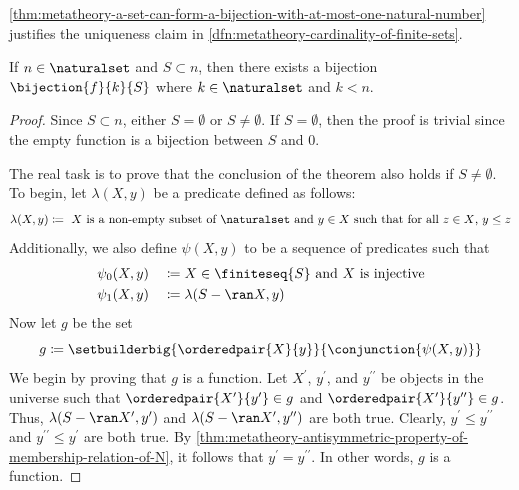 \begin{rem}
    \cref{thm:metatheory-a-set-can-form-a-bijection-with-at-most-one-natural-number} justifies the uniqueness claim
    in \cref{dfn:metatheory-cardinality-of-finite-sets}.
\end{rem}

\begin{thm}
     \label{thm:metatheory-every-proper-subset-of-a-natural-number-can-form-bijections-with-a-natural-number-less-than-the-number}
    If \( n \in \naturalset \) and \( S \subset n \), then there exists a bijection \( \bijection{f}{k}{S} \) where \( k \in \naturalset \)
    and \( k < n \).
\end{thm}

\begin{proof}
    Since \( S \subset n \), either \( S = \emptyset \) or \( S \neq \emptyset \).
    If \( S = \emptyset \), then the proof is trivial since the empty function is a bijection between \( S \) and \( 0 \).

    \vspace{0.3cm}
    \noindent
    The real task is to prove that the conclusion of the theorem also holds if \( S \neq \emptyset \).
    To begin, let \( \lambda(X, y) \) be a predicate defined as follows:
    \begin{equation*}
        \lambda(X, y) \coloneq \ \text{\( X \) is a non-empty subset of \( \naturalset \) and \( y \in X \) such that for all \( z \in X \), \( y \leq z \)}
    \end{equation*}
    Additionally, we also define \( \psi(X, y) \) to be a sequence of predicates such that
    \begin{alignat*}{2}
        &\psi_{0}(X, y) &&\coloneq \text{\( X \in \finiteseq{S} \) and \( X \) is injective}\\
        &\psi_{1}(X, y) &&\coloneq \lambda(S - \ran X, y)
    \end{alignat*}
    Now let \( g \) be the set
    \begin{equation*}
        g \coloneq \setbuilderbig{\orderedpair{X}{y}}{\conjunction{\psi(X, y)}}
    \end{equation*}
    We begin by proving that \( g \) is a function.
    Let \( X^{\prime} \), \( y^{\prime} \), and \( y^{\prime\prime} \) be objects in the universe such that
    \( \orderedpair{X^{\prime}}{y^{\prime}} \in g \) and \( \orderedpair{X^{\prime}}{y^{\prime\prime}} \in g \).
    Thus, \( \lambda(S - \ran X^{\prime}, y^{\prime}) \) and \( \lambda(S - \ran X^{\prime}, y^{\prime\prime}) \) are both true.
    Clearly, \( y^{\prime} \leq y^{\prime\prime} \) and \( y^{\prime\prime} \leq y^{\prime} \) are both true.
    By \cref{thm:metatheory-antisymmetric-property-of-membership-relation-of-N}, it follows that \( y^{\prime} = y^{\prime\prime} \).
    In other words, \( g \) is a function.


\end{proof}
